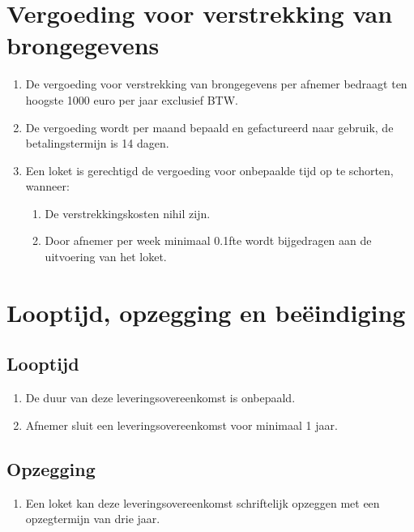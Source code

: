 \documentclass[10pt, a4paper]{article}
\begin{document}
\section{Vergoeding voor verstrekking van brongegevens}
\begin{enumerate}
   \item De vergoeding voor verstrekking van brongegevens per afnemer bedraagt ten hoogste 1000 euro per jaar exclusief BTW.
   \item De vergoeding wordt per maand bepaald en gefactureerd naar gebruik, de betalingstermijn is 14 dagen.
   \item Een loket is gerechtigd de vergoeding voor onbepaalde tijd op te schorten, wanneer:
   \begin{enumerate}
        \item De verstrekkingskosten nihil zijn. 
        \item Door afnemer per week minimaal 0.1fte wordt bijgedragen aan de uitvoering van het loket.
   \end{enumerate}
\end{enumerate}

\section{Looptijd, opzegging en beëindiging}
\subsection*{Looptijd}
\begin{enumerate}
   \item De duur van deze leveringsovereenkomst is onbepaald.
   \item Afnemer sluit een leveringsovereenkomst voor minimaal 1 jaar.
\end{enumerate}

\subsection*{Opzegging}
\begin{enumerate}
   \item Een loket kan deze leveringsovereenkomst schriftelijk opzeggen met een opzegtermijn van drie jaar.
\end{enumerate}
\end{document}
